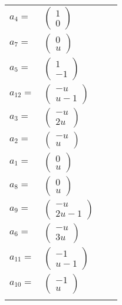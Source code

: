 \documentclass[1p]{elsarticle_modified}
\theoremstyle{definition}
\begin{document}
\begin{tabular}{m{7pt} m{180pt} m{7pt} m{180pt} }
\flushright $a_{4}=$&$\begin{pmatrix}1\\0\end{pmatrix}$ \\
\flushright $a_{7}=$&$\begin{pmatrix}0\\u\end{pmatrix}$ \\
\flushright $a_{5}=$&$\begin{pmatrix}1\\-1\end{pmatrix}$ \\
\flushright $a_{12}=$&$\begin{pmatrix}- u\\u-1\end{pmatrix}$ \\
\flushright $a_{3}=$&$\begin{pmatrix}- u\\2 u\end{pmatrix}$ \\
\flushright $a_{2}=$&$\begin{pmatrix}- u\\u\end{pmatrix}$ \\
\flushright $a_{1}=$&$\begin{pmatrix}0\\u\end{pmatrix}$ \\
\flushright $a_{8}=$&$\begin{pmatrix}0\\u\end{pmatrix}$ \\
\flushright $a_{9}=$&$\begin{pmatrix}- u\\2 u-1\end{pmatrix}$ \\
\flushright $a_{6}=$&$\begin{pmatrix}- u\\3 u\end{pmatrix}$ \\
\flushright $a_{11}=$&$\begin{pmatrix}-1\\u-1\end{pmatrix}$ \\
\flushright $a_{10}=$&$\begin{pmatrix}-1\\u\end{pmatrix}$\\&\end{tabular}
\end{document}
